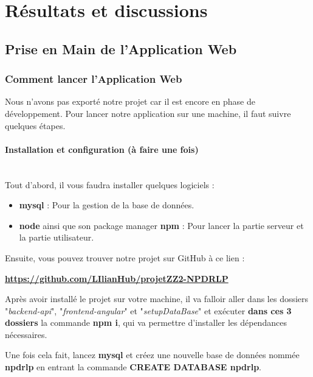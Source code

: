 \documentclass[12pt,french]{article}
\begin{document}
\section{Résultats et discussions}

\subsection{Prise en Main de l'Application Web}

\subsubsection{Comment lancer l'Application Web}

Nous n'avons pas exporté notre projet car il est encore en phase de développement. Pour lancer notre application sur une machine, il faut suivre quelques étapes.

\newpage

\paragraph{Installation et configuration (à faire une fois) \\\\}

Tout d'abord, il vous faudra installer quelques logiciels :

\begin{itemize}
	\item \textbf{mysql} : Pour la gestion de la base de données.
	\item \textbf{node} ainsi que son package manager \textbf{npm} : Pour lancer la partie serveur et la partie utilisateur.
\end{itemize}

\bigskip

Ensuite, vous pouvez trouver notre projet sur GitHub à ce lien :

\textbf{\href{https://github.com/LIlianHub/projetZZ2-NPDRLP}{https://github.com/LIlianHub/projetZZ2-NPDRLP}}

\bigskip

Après avoir installé le projet sur votre machine, il va falloir aller dans les dossiers "\textit{backend-api}", "\textit{frontend-angular}" et "\textit{setupDataBase}" et exécuter \textbf{dans ces 3 dossiers} la commande \textbf{npm i}, qui va permettre d'installer les dépendances nécessaires.

\bigskip

Une fois cela fait, lancez \textbf{mysql} et créez une nouvelle base de données nommée \textbf{npdrlp} en entrant la commande \textbf{CREATE DATABASE npdrlp}.
\end{document}
